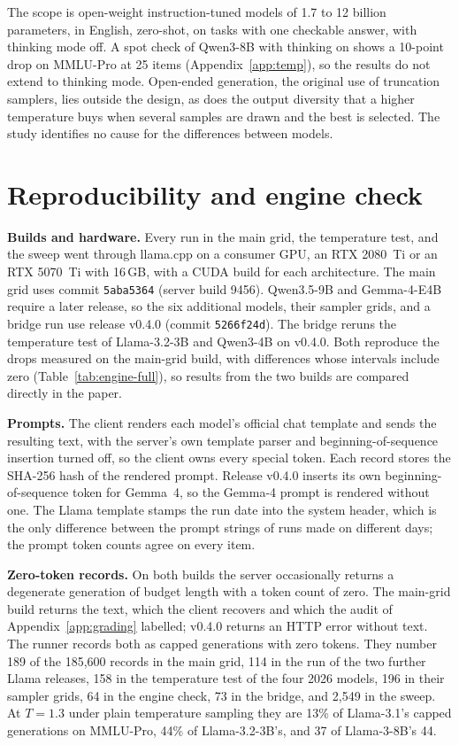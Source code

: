 \documentclass[10pt]{article}
\begin{document}
The scope is open-weight instruction-tuned models of 1.7 to 12 billion parameters, in English,
zero-shot, on tasks with one checkable answer, with thinking mode off. A spot check of Qwen3-8B
with thinking on shows a 10-point drop on MMLU-Pro at 25 items (Appendix~\ref{app:temp}), so
the results do not extend to thinking mode. Open-ended generation, the original use of
truncation samplers, lies outside the design, as does the output diversity that a higher
temperature buys when several samples are drawn and the best is selected. The study identifies
no cause for the differences between models.




\appendix

\section{Reproducibility and engine check}
\label{app:repro}

\textbf{Builds and hardware.} Every run in the main grid, the temperature test, and the sweep
went through llama.cpp \citep{gerganov2023llamacpp} on a consumer GPU, an RTX 2080~Ti or an
RTX 5070~Ti with 16\,GB, with a CUDA build for each architecture. The main grid uses commit
\texttt{5aba5364} (server build 9456). Qwen3.5-9B and Gemma-4-E4B require a later release, so
the six additional models, their sampler grids, and a bridge run use release v0.4.0 (commit
\texttt{5266f24d}). The bridge reruns the temperature test of Llama-3.2-3B and Qwen3-4B on
v0.4.0. Both reproduce the drops measured on the main-grid build, with differences whose
intervals include zero (Table~\ref{tab:engine-full}), so results from the two builds are
compared directly in the paper.

\textbf{Prompts.} The client renders each model's official chat template and sends the
resulting text, with the server's own template parser and beginning-of-sequence insertion
turned off, so the client owns every special token. Each record stores the SHA-256 hash of the
rendered prompt. Release v0.4.0 inserts its own beginning-of-sequence token for Gemma~4, so the
Gemma-4 prompt is rendered without one. The Llama template stamps the run date into the system
header, which is the only difference between the prompt strings of runs made on different
days; the prompt token counts agree on every item.

\textbf{Zero-token records.} On both builds the server occasionally returns a degenerate
generation of budget length with a token count of zero. The main-grid build returns the text,
which the client recovers and which the audit of Appendix~\ref{app:grading} labelled;
v0.4.0 returns an HTTP error without text. The runner records both as capped generations with
zero tokens. They number 189 of the 185,600 records in the main grid, 114 in the run of the two
further Llama releases, 158 in the temperature test of the four 2026 models, 196 in their
sampler grids, 64 in the engine check, 73 in the bridge, and 2,549 in the sweep. At $T{=}1.3$
under plain temperature sampling they are 13\% of Llama-3.1's capped generations on MMLU-Pro, 44\%
of Llama-3.2-3B's, and 37 of Llama-3-8B's 44.
\end{document}
